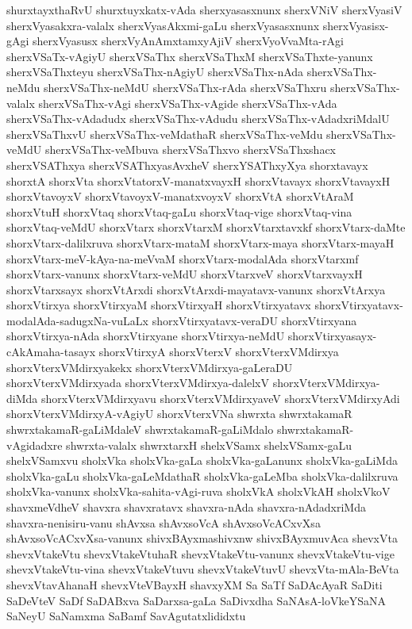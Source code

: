 {shurxtayxthaRvU
shurxtuyxkatx-vAda
sherxyasasxnunx
sherxVNiV
sherxVyasiV
sherxVyasakxra-valalx
sherxVyasAkxmi-gaLu
sherxVyasasxnunx
sherxVyasisx-gAgi
sherxVyasusx
sherxVyAnAmxtamxyAjiV
sherxVyoVvaMta-rAgi
sherxVSaTx-vAgiyU
sherxVSaThx
sherxVSaThxM
sherxVSaThxte-yanunx
sherxVSaThxteyu
sherxVSaThx-nAgiyU
sherxVSaThx-nAda
sherxVSaThx-neMdu
sherxVSaThx-neMdU
sherxVSaThx-rAda
sherxVSaThxru
sherxVSaThx-valalx
sherxVSaThx-vAgi
sherxVSaThx-vAgide
sherxVSaThx-vAda
sherxVSaThx-vAdadudx
sherxVSaThx-vAdudu
sherxVSaThx-vAdadxriMdalU
sherxVSaThxvU
sherxVSaThx-veMdathaR
sherxVSaThx-veMdu
sherxVSaThx-veMdU
sherxVSaThx-veMbuva
sherxVSaThxvo
sherxVSaThxshacx
sherxVSAThxya
sherxVSAThxyasAvxheV
sherxYSAThxyXya
shorxtavayx
shorxtA
shorxVta
shorxVtatorxV-manatxvayxH
shorxVtavayx
shorxVtavayxH
shorxVtavoyxV
shorxVtavoyxV-manatxvoyxV
shorxVtA
shorxVtAraM
shorxVtuH
shorxVtaq
shorxVtaq-gaLu
shorxVtaq-vige
shorxVtaq-vina
shorxVtaq-veMdU
shorxVtarx
shorxVtarxM
shorxVtarxtavxkf
shorxVtarx-daMte
shorxVtarx-dalilxruva
shorxVtarx-mataM
shorxVtarx-maya
shorxVtarx-mayaH
shorxVtarx-meV-kAya-na-meVvaM
shorxVtarx-modalAda
shorxVtarxmf
shorxVtarx-vanunx
shorxVtarx-veMdU
shorxVtarxveV
shorxVtarxvayxH
shorxVtarxsayx
shorxVtArxdi
shorxVtArxdi-mayatavx-vanunx
shorxVtArxya
shorxVtirxya
shorxVtirxyaM
shorxVtirxyaH
shorxVtirxyatavx
shorxVtirxyatavx-modalAda-sadugxNa-vuLaLx
shorxVtirxyatavx-veraDU
shorxVtirxyana
shorxVtirxya-nAda
shorxVtirxyane
shorxVtirxya-neMdU
shorxVtirxyasayx-cAkAmaha-tasayx
shorxVtirxyA
shorxVterxV
shorxVterxVMdirxya
shorxVterxVMdirxyakekx
shorxVterxVMdirxya-gaLeraDU
shorxVterxVMdirxyada
shorxVterxVMdirxya-dalelxV
shorxVterxVMdirxya-diMda
shorxVterxVMdirxyavu
shorxVterxVMdirxyaveV
shorxVterxVMdirxyAdi
shorxVterxVMdirxyA-vAgiyU
shorxVterxVNa
shwrxta
shwrxtakamaR
shwrxtakamaR-gaLiMdaleV
shwrxtakamaR-gaLiMdalo
shwrxtakamaR-vAgidadxre
shwrxta-valalx
shwrxtarxH
shelxVSamx
shelxVSamx-gaLu
shelxVSamxvu
sholxVka
sholxVka-gaLa
sholxVka-gaLanunx
sholxVka-gaLiMda
sholxVka-gaLu
sholxVka-gaLeMdathaR
sholxVka-gaLeMba
sholxVka-dalilxruva
sholxVka-vanunx
sholxVka-sahita-vAgi-ruva
sholxVkA
sholxVkAH
sholxVkoV
shavxmeVdheV
shavxra
shavxratavx
shavxra-nAda
shavxra-nAdadxriMda
shavxra-nenisiru-vanu
shAvxsa
shAvxsoVcA
shAvxsoVcACxvXsa
shAvxsoVcACxvXsa-vanunx
shivxBAyxmashivxnw
shivxBAyxmuvAca
shevxVta
shevxVtakeVtu
shevxVtakeVtuhaR
shevxVtakeVtu-vanunx
shevxVtakeVtu-vige
shevxVtakeVtu-vina
shevxVtakeVtuvu
shevxVtakeVtuvU
shevxVta-mAla-BeVta
shevxVtavAhanaH
shevxVteVBayxH
shavxyXM
Sa
SaTf
SaDAcAyaR
SaDiti
SaDeVteV
SaDf
SaDABxva
SaDarxsa-gaLa
SaDivxdha
SaNAsA-loVkeYSaNA
SaNeyU
SaNamxma
SaBamf
SavAgutatxlididxtu
}
